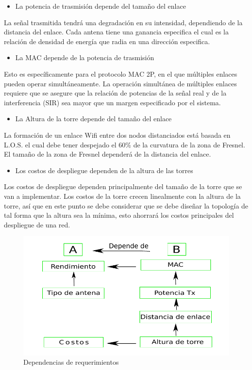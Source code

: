 \documentclass[]{article}
\providecommand{\tightlist}{%
  \setlength{\itemsep}{0pt}\setlength{\parskip}{0pt}}
\begin{document}
\begin{itemize}
\tightlist
\item
  La potencia de trasmisión depende del tamaño del enlace
\end{itemize}

La señal trasmitida tendrá una degradación en su intensidad, dependiendo
de la distancia del enlace. Cada antena tiene una ganancia especifica el
cual es la relación de densidad de energía que radia en una dirección
especifica.

\begin{itemize}
\tightlist
\item
  La MAC depende de la potencia de trasmisión
\end{itemize}

Esto es específicamente para el protocolo MAC 2P, en el que múltiples
enlaces pueden operar simultáneamente. La operación simultánea de
múltiples enlaces requiere que se asegure que la relación de potencias
de la señal real y de la interferencia (SIR) sea mayor que un margen
especificado por el sistema.

\begin{itemize}
\tightlist
\item
  La Altura de la torre depende del tamaño del enlace
\end{itemize}

La formación de un enlace Wifi entre dos nodos distanciados está basada
en L.O.S. el cual debe tener despejado el 60\% de la curvatura de la
zona de Fresnel. El tamaño de la zona de Fresnel dependerá de la
distancia del enlace.

\begin{itemize}
\tightlist
\item
  Los costos de despliegue dependen de la altura de las torres
\end{itemize}

Los costos de despliegue dependen principalmente del tamaño de la torre
que se van a implementar. Los costos de la torre crecen linealmente con
la altura de la torre, así que en este punto se debe considerar que se
debe diseñar la topología de tal forma que la altura sea la mínima, esto
ahorrará los costos principales del despliegue de una red.

\begin{figure}
\centering
\includegraphics{dependencias.pdf}
\caption{Dependencias de requerimientos}
\end{figure}
\end{document}
